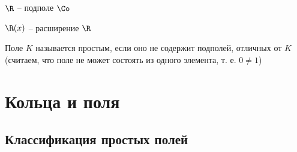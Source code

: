 \begin{exmpls}
	\item $ \R $ -- подполе $ \Co $
	\item $ \R(x) $ -- расширение $ \R $
\end{exmpls}

\begin{definition}
	Поле $ K $ называется простым, если оно не содержит подполей, отличных от $ K $ \\
	(считаем, что поле не может состоять из одного элемента, т. е. $ 0 \ne 1 $)
\end{definition}


\chapter{Кольца и поля}

\section{Классификация простых полей}

